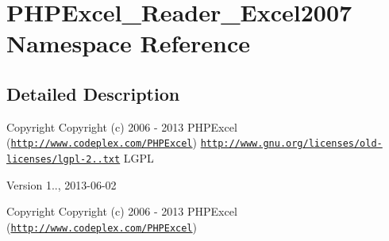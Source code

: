 \hypertarget{namespacePHPExcel__Reader__Excel2007}{}\section{P\+H\+P\+Excel\+\_\+\+Reader\+\_\+\+Excel2007 Namespace Reference}
\label{namespacePHPExcel__Reader__Excel2007}


\subsection{Detailed Description}
\begin{DoxyCopyright}{Copyright}
Copyright (c) 2006 -\/ 2013 P\+H\+P\+Excel (\href{http://www.codeplex.com/PHPExcel}{\tt http\+://www.\+codeplex.\+com/\+P\+H\+P\+Excel})  \href{http://www.gnu.org/licenses/old-licenses/lgpl-2.1.txt}{\tt http\+://www.\+gnu.\+org/licenses/old-\/licenses/lgpl-\/2..\+txt} L\+G\+PL 
\end{DoxyCopyright}
\begin{DoxyVersion}{Version}
1.., 2013-\/06-\/02
\end{DoxyVersion}
\begin{DoxyCopyright}{Copyright}
Copyright (c) 2006 -\/ 2013 P\+H\+P\+Excel (\href{http://www.codeplex.com/PHPExcel}{\tt http\+://www.\+codeplex.\+com/\+P\+H\+P\+Excel}) 
\end{DoxyCopyright}
